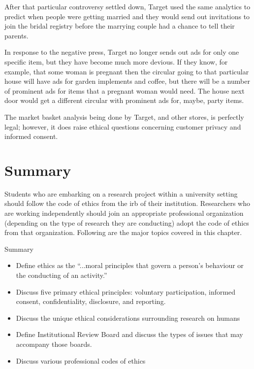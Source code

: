 After that particular controversy settled down, Target used the same analytics to predict when people were getting married and they would send out invitations to join the bridal registry before the marrying couple had a chance to tell their parents.

In response to the negative press, Target no longer sends out ads for only one specific item, but they have become much more devious. If they know, for example, that some woman is pregnant then the circular going to that particular house will have ads for garden implements and coffee, but there will be a number of prominent ads for items that a pregnant woman would need. The house next door would get a different circular with prominent ads for, maybe, party items.

The market basket analysis being done by Target, and other stores, is perfectly legal; however, it does raise ethical questions concerning customer privacy and informed consent. 

\section{Summary}

Students who are embarking on a research project within a university setting should follow  the code of ethics from the \gls{irb} of their institution. Researchers who are working independently should join an appropriate professional organization (depending on the type of research they are conducting) adopt the code of ethics from that organization. Following are the major topics covered in this chapter.

\begin{center}
	\begin{tkawybox}{Summary}
		\begin{itemize}
			\setlength{\itemsep}{0pt}
			\setlength{\parskip}{0pt}
			\setlength{\parsep}{0pt}
			
			\item Define ethics as the ``...moral principles that govern a person's behaviour or the conducting of an activity.''
			\item Discuss five primary ethical principles: voluntary participation, informed consent, confidentiality, disclosure, and reporting.
			\item Discuss the unique ethical considerations surrounding research on humans
			\item Define Institutional Review Board and discuss the types of issues that may accompany those boards.
			\item Discuss various professional codes of ethics
		\end{itemize}
	\end{tkawybox}
\end{center}


